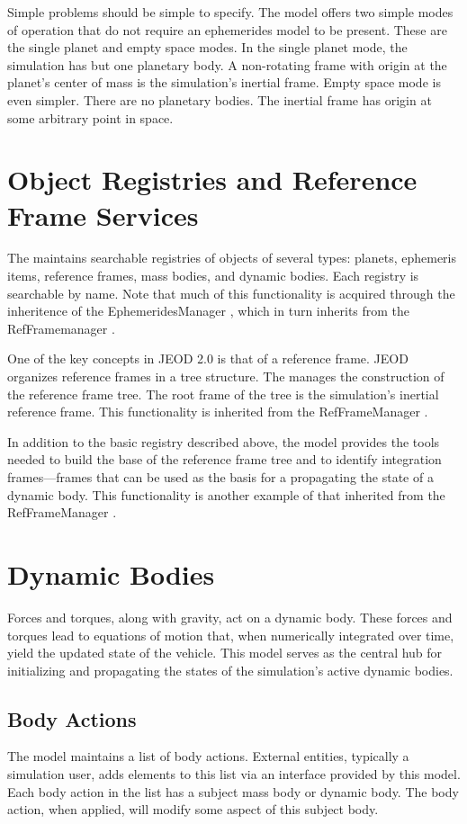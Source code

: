 Simple problems should be simple to specify. The model offers two simple
modes of operation that do not require an ephemerides model to be present.
These are the single planet and empty space modes. In the single planet mode,
the simulation has but one planetary body. A non-rotating frame with origin
at the planet's center of mass is the simulation's inertial frame.
Empty space mode is even simpler. There are no planetary bodies. The
inertial frame has origin at some arbitrary point in space.

\section*{Object Registries and Reference Frame Services}
The \ModelDesc maintains searchable registries of objects of several types:
planets, ephemeris items, reference frames, mass bodies, and dynamic bodies.
Each registry is searchable by name. Note that much of this functionality
is acquired through the inheritence of the
EphemeridesManager \cite{dynenv:EPHEMERIDES}, which in turn inherits
from the RefFramemanager \cite{dynenv:REFFRAMES}.

One of the key concepts in JEOD 2.0 is that of a reference frame.
JEOD organizes reference frames in a tree structure.
The \ModelDesc manages the construction of the reference frame
tree.
The root frame of the tree is the simulation's inertial
reference frame. This functionality is inherited from the
RefFrameManager \cite{dynenv:REFFRAMES}.

In addition to the basic registry described above,
the model provides the tools needed to build the base of the reference
frame tree and to identify integration frames---frames that can be used as
the basis for a propagating the state of a dynamic body. This functionality
is another example of that inherited from the
RefFrameManager \cite{dynenv:REFFRAMES}.

\section*{Dynamic Bodies}
Forces and torques, along with gravity, act on a dynamic body.
These forces and torques lead to equations of motion that,
when numerically integrated over time,
yield the updated state of the vehicle.
This model serves as the central hub for initializing and propagating
the states of the simulation's active dynamic bodies.

\subsection*{Body Actions}
The model maintains a list of body actions. External entities,
typically a simulation user, adds elements to this list via an
interface provided by this model. Each body action in the list has
a subject mass body or dynamic body. The body action, when applied,
will modify some aspect of this subject body.

